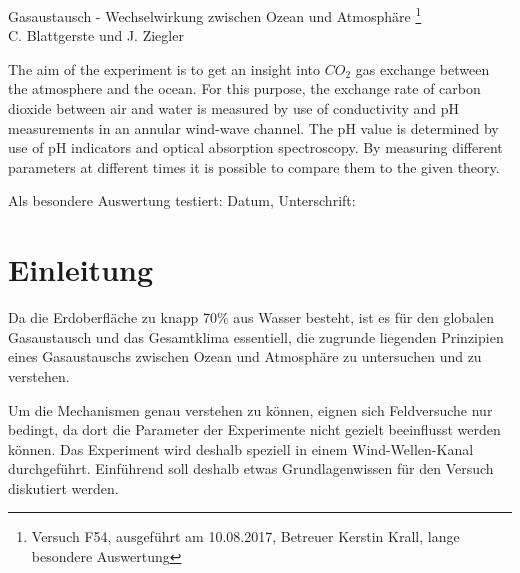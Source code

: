 \documentclass[12pt]{article}
\begin{document}
\thispagestyle{empty}     %
\null\vspace{40mm}
\begin{center}
{%
\Large  Gasaustausch - Wechselwirkung zwischen Ozean und Atmosph\"are
\footnote{\noindent Versuch F54, ausgef\"uhrt am 10.08.2017, Betreuer Kerstin Krall, lange besondere Auswertung}
}\\[15mm]
C. Blattgerste und J. Ziegler

\vspace{25mm}

\parbox{0.9\textwidth}{   %
   
\small The aim of the experiment is to get an insight into $CO_2$ gas exchange between the atmosphere and the ocean. For this purpose, the exchange rate of carbon dioxide between air and water is measured by use of conductivity and pH measurements in an annular wind-wave channel. The pH value is determined by use of pH indicators and optical absorption spectroscopy. By measuring different parameters at different times it is possible to compare them to the given theory.
}
\end{center}

\vfill
Als besondere Auswertung testiert: Datum, Unterschrift:
\vspace{20mm}

\newpage  
\null\thispagestyle{empty} 
   
\newpage     %
\tableofcontents 
{}
\newpage

\section{Einleitung}

Da die Erdoberfläche zu knapp 70\% aus Wasser besteht, ist es für den globalen Gasaustausch und das Gesamtklima essentiell, die zugrunde liegenden Prinzipien eines Gasaustauschs zwischen Ozean und Atmosphäre zu untersuchen und zu verstehen.

Um die Mechanismen genau verstehen zu können, eignen sich Feldversuche nur bedingt, da dort die Parameter der Experimente nicht gezielt beeinflusst werden können. Das Experiment wird deshalb speziell in einem Wind-Wellen-Kanal durchgeführt. Einführend soll deshalb etwas Grundlagenwissen für den Versuch diskutiert werden.
\end{document}
